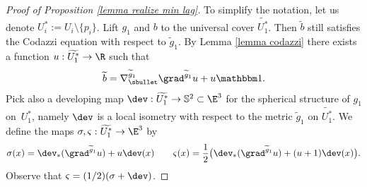 \begin{proof}[Proof of Proposition \ref{lemma realize min lag}]
To simplify the notation, let us denote $U_i^*:=U_i\setminus\{p_i\}$.
Lift $g_1$ and $b$ to the universal cover $\widetilde{U_1^*}$. Then $\widetilde b$ still satisfies the Codazzi equation with respect to $\widetilde g_1$. By Lemma \ref{lemma codazzi} there exists a function $u:\widetilde {U_1^*}\to\R$ such that
\[
\widetilde b=\nabla^{\widetilde g_1}_\sbullet\grad^{\widetilde g_1} u+u\mathbbm 1.
\]
Pick also a developing map $\dev:\widetilde {U_1^*}\to\mathbb S^2\subset\E^3$ for the spherical structure of $g_1$ on~$U_1^*$, namely $\dev$ is a local isometry with respect to the metric $\widetilde g_1$ on $\widetilde {U_1^*}$. We define the maps $\sigma,\varsigma:\widetilde {U_1^*}\to\E^3$ by
\[
\sigma(x)=\dev_*(\grad^{\widetilde g_1}u)+u\dev(x) \qquad \varsigma(x)=\frac{1}{2}\bigl(\dev_*(\grad^{\widetilde g_1}u)+(u+1)\dev(x) \bigr).
\]
Observe that $\varsigma=(1/2)(\sigma+\dev)$.


\end{proof}
